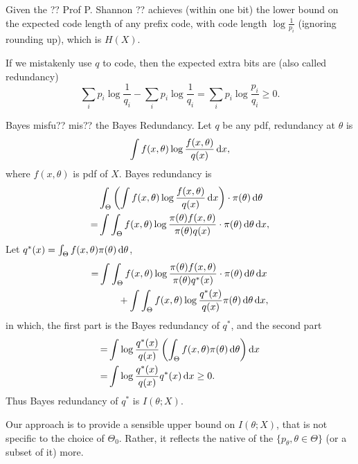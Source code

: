 Given the ?? Prof P. Shannon ?? achieves (within one bit) the lower bound on the expected code length of any prefix code, with code length $\log\frac{1}{p_{i}}$ (ignoring rounding up), which is $H(X)$.

If we mistakenly use $q$ to code, then the expected extra bits are (also called redundancy)
\begin{equation}
	\sum_{i}p_{i}\log\frac{1}{q_{i}}-\sum_{i}p_{i}\log\frac{1}{q_{i}}=\sum_{i}p_{i}\log\frac{p_{i}}{q_{i}}\geq 0.
\end{equation}

Bayes misfu?? mis?? the Bayes Redundancy. Let $q$ be any pdf, redundancy at $\theta$ is
\begin{equation}
	\int f(x,\theta)\log\frac{f(x,\theta)}{q(x)}\mathop{}\!\mathrm{d} x,
\end{equation}
where $f(x,\theta)$ is pdf of $X$. Bayes redundancy is
\begin{equation}
	\begin{aligned}
		  & \int_{\Theta}\left(\int f(x,\theta)\log\frac{f(x,\theta)}{q(x)}\mathop{}\!\mathrm{d} x\right)\cdot\pi(\theta)\mathop{}\!\mathrm{d}\theta          \\
		= & \int\int_{\Theta}f(x,\theta)\log\frac{\pi(\theta)f(x,\theta)}{\pi(\theta)q(x)}\cdot\pi(\theta)\mathop{}\!\mathrm{d}\theta\mathop{}\!\mathrm{d} x,
	\end{aligned}
\end{equation}
Let $q^{*}(x)=\int_{\Theta}f(x,\theta)\pi(\theta)\mathop{}\!\mathrm{d}\theta$,
\begin{equation}
	\begin{aligned}
		= & \int\int_{\Theta}f(x,\theta)\log\frac{\pi(\theta)f(x,\theta)}{\pi(\theta)q^{*}(x)}\cdot\pi(\theta)\mathop{}\!\mathrm{d}\theta\mathop{}\!\mathrm{d} x \\
		  & \qquad+\int\int_{\Theta}f(x,\theta)\log\frac{q^{*}(x)}{q(x)}\pi(\theta)\mathop{}\!\mathrm{d}\theta\mathop{}\!\mathrm{d} x,
	\end{aligned}
\end{equation}
in which, the first part is the Bayes redundancy of $q^{*}$, and the second part
\begin{equation}
	\begin{aligned}
		= & \int\log\frac{q^{*}(x)}{q(x)}\left(\int_{\Theta}f(x,\theta)\pi(\theta)\mathop{}\!\mathrm{d}\theta\right)\mathop{}\!\mathrm{d} x \\
		= & \int\log\frac{q^{*}(x)}{q(x)}q^{*}(x)\mathop{}\!\mathrm{d} x\geq 0.
	\end{aligned}
\end{equation}
Thus Bayes redundancy of $q^{*}$ is $I\left(\theta;X\right)$.

Our approach is to provide a sensible upper bound on $I\left(\theta; X\right)$, that is not specific to the choice of $\Theta_{0}$. Rather, it reflects the native of the $\{p_{\theta},\theta\in\Theta\}$ (or a subset of it) more.

